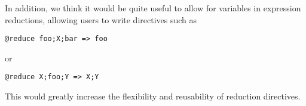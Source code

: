In addition, we think it would be quite useful to allow for
variables in expression reductions, allowing users to write
directives such as

\begin{verbatim}
@reduce foo;X;bar => foo
\end{verbatim}

or

\begin{verbatim}
@reduce X;foo;Y => X;Y
\end{verbatim}

This would greatly increase the flexibility and reusability of
reduction directives.
